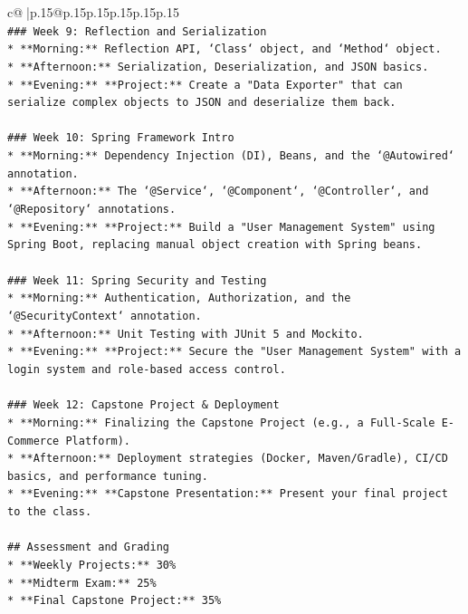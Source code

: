 \documentclass{article}
\begin{document}
{\begin{supertabular}{c@{$\;$}|p{.15\linewidth}@{}p{.15\linewidth}p{.15\linewidth}p{.15\linewidth}p{.15\linewidth}p{.15\linewidth}}
{{{\\ 
\texttt{\#\#\# Week 9: Reflection and Serialization} \\
\texttt{*   **Morning:** Reflection API, `Class` object, and `Method` object.} \\
\texttt{*   **Afternoon:** Serialization, Deserialization, and JSON basics.} \\
\texttt{*   **Evening:** **Project:** Create a "Data Exporter" that can serialize complex objects to JSON and deserialize them back.} \\
\\ 
\texttt{\#\#\# Week 10: Spring Framework Intro} \\
\texttt{*   **Morning:** Dependency Injection (DI), Beans, and the `@Autowired` annotation.} \\
\texttt{*   **Afternoon:** The `@Service`, `@Component`, `@Controller`, and `@Repository` annotations.} \\
\texttt{*   **Evening:** **Project:** Build a "User Management System" using Spring Boot, replacing manual object creation with Spring beans.} \\
\\ 
\texttt{\#\#\# Week 11: Spring Security and Testing} \\
\texttt{*   **Morning:** Authentication, Authorization, and the `@SecurityContext` annotation.} \\
\texttt{*   **Afternoon:** Unit Testing with JUnit 5 and Mockito.} \\
\texttt{*   **Evening:** **Project:** Secure the "User Management System" with a login system and role{-}based access control.} \\
\\ 
\texttt{\#\#\# Week 12: Capstone Project \& Deployment} \\
\texttt{*   **Morning:** Finalizing the Capstone Project (e.g., a Full{-}Scale E{-}Commerce Platform).} \\
\texttt{*   **Afternoon:** Deployment strategies (Docker, Maven/Gradle), CI/CD basics, and performance tuning.} \\
\texttt{*   **Evening:** **Capstone Presentation:** Present your final project to the class.} \\
\\ 
\texttt{\#\# Assessment and Grading} \\
\texttt{*   **Weekly Projects:** 30\%} \\
\texttt{*   **Midterm Exam:** 25\%} \\
\texttt{*   **Final Capstone Project:** 35\%} \\
}}}
\end{supertabular}}
\end{document}
